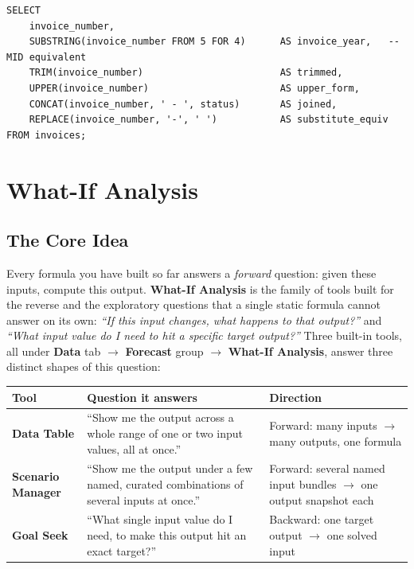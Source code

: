 \documentclass[11pt,a4paper]{article}
\begin{document}
\begin{lstlisting}[style=sqlstyle, caption={The direct SQL string-function equivalents}]
SELECT
    invoice_number,
    SUBSTRING(invoice_number FROM 5 FOR 4)      AS invoice_year,   -- MID equivalent
    TRIM(invoice_number)                        AS trimmed,
    UPPER(invoice_number)                       AS upper_form,
    CONCAT(invoice_number, ' - ', status)       AS joined,
    REPLACE(invoice_number, '-', ' ')           AS substitute_equiv
FROM invoices;
\end{lstlisting}

\section{What-If Analysis}
\label{sec:whatif}

\subsection{The Core Idea}
\label{sec:whatifintro}

\begin{keyconcept}
Every formula you have built so far answers a \emph{forward} question: given these inputs, compute this output. \textbf{What-If Analysis} is the family of tools built for the reverse and the exploratory questions that a single static formula cannot answer on its own: \emph{``If this input changes, what happens to that output?''} and \emph{``What input value do I need to hit a specific target output?''} Three built-in tools, all under \textbf{Data} tab $\rightarrow$ \textbf{Forecast} group $\rightarrow$ \textbf{What-If Analysis}, answer three distinct shapes of this question:
\end{keyconcept}

\begin{center}
\begin{tabular}{@{}L{2.6cm}L{5.2cm}L{4.6cm}@{}}
\toprule
\textbf{Tool} & \textbf{Question it answers} & \textbf{Direction} \\
\midrule
\textbf{Data Table} & ``Show me the output across a whole range of one or two input values, all at once.'' & Forward: many inputs $\to$ many outputs, one formula \\
\textbf{Scenario Manager} & ``Show me the output under a few named, curated combinations of several inputs at once.'' & Forward: several named input bundles $\to$ one output snapshot each \\
\textbf{Goal Seek} & ``What single input value do I need, to make this output hit an exact target?'' & Backward: one target output $\to$ one solved input \\
\bottomrule
\end{tabular}
\end{center}
\end{document}
